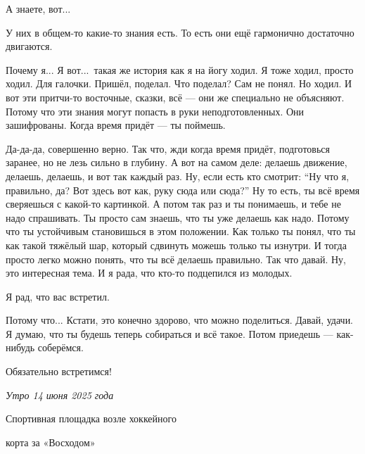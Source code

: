 \I
А знаете, вот...

\M
У них в общем-то какие-то знания есть. То есть они ещё гармонично достаточно двигаются.

\I
Почему я... Я вот...\
такая же история как я на йогу ходил.
Я тоже ходил, просто ходил.
Для галочки.
Пришёл, поделал. Что поделал? Сам не понял.
Но ходил.
И вот эти притчи-то восточные, сказки, всё --- они же специально не объясняют.
Потому что эти знания могут попасть в руки неподготовленных.
Они зашифрованы.
Когда время придёт --- ты поймешь.

\M
Да-да-да, совершенно верно.
Так что, жди когда время придёт, подготовься заранее, но не лезь сильно в глубину.
А вот на самом деле: делаешь движение, делаешь, делаешь, и вот так каждый раз.
Ну, если есть кто смотрит: ``Ну что я, правильно, да? Вот здесь вот как, руку сюда или сюда?''
Ну то есть, ты всё время сверяешься с какой-то картинкой.
А потом так {\csc раз} и ты понимаешь, и тебе не надо спрашивать.
Ты просто сам знаешь, что ты уже делаешь как надо.
Потому что ты устойчивым становишься в этом положении.
Как только ты понял, что ты как такой тяжёлый шар, который сдвинуть можешь только ты изнутри.
И тогда просто легко можно понять, что ты всё делаешь правильно. Так что давай.
Ну, это интересная тема.
И я рада, что кто-то подцепился из молодых.

\I
Я рад, что вас встретил.

\M
Потому что... Кстати, это конечно здорово, что можно
поделиться. Давай, удачи. Я думаю, что ты будешь теперь собираться и всё такое.
Потом приедешь --- как-нибудь соберёмся.

\I
Обязательно встретимся!

\kern2cm
\it
\lineskip=7pt
\hskip6cm Утро 14 июня 2025 года \par
\hskip3.8cm Спортивная площадка возле хоккейного \par
\hskip7.3cm корта за «Восходом» \par
\bye
